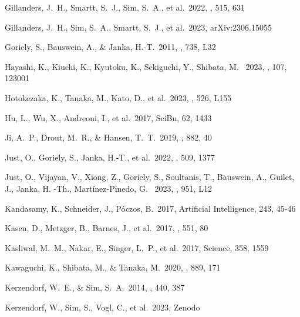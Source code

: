 \documentclass[twocolumn,twocolappendix]{aastex63}
\begin{document}
{{{{{{{{\begin{thebibliography}{}
 Gillanders, J.~H., Smartt, S.~J., Sim, S.~A., et al.\ 2022, \mnras, 515, 631


 Gillanders, J.~H., Sim, S.~A., Smartt, S.~J., et al.\ 2023, arXiv:2306.15055


 Goriely, S., Bauswein, A., \& Janka, H.-T.\ 2011, \apjl, 738, L32


 Hayashi, K., Kiuchi, K., Kyutoku, K., Sekiguchi, Y., Shibata, M. \ 2023, \prd, 107, 123001


 Hotokezaka, K., Tanaka, M., Kato, D., et al.\ 2023, \mnras, 526, L155


 Hu, L., Wu, X., Andreoni, I., et al.\ 2017, SciBu, 62, 1433


 Ji, A.~P., Drout, M.~R., \& Hansen, T.~T.\ 2019, \apj, 882, 40


 Just, O., Goriely, S., Janka, H.-T., et al.\ 2022, \mnras, 509, 1377

 Just, O., Vijayan, V., Xiong, Z., Goriely, S., Soultanis, T., Bauswein, A., Guilet, J., Janka, H. -Th., Martínez-Pinedo, G. \ 2023, \apjl, 951, L12


 Kandasamy, K., Schneider, J., P{\'o}czos, B.\ 2017, Artificial Intelligence, 243, 45-46


 Kasen, D., Metzger, B., Barnes, J., et al.\ 2017, \nat, 551, 80


 Kasliwal, M.~M., Nakar, E., Singer, L.~P., et al.\ 2017, Science, 358, 1559


 Kawaguchi, K., Shibata, M., \& Tanaka, M.\ 2020, \apj, 889, 171


 Kerzendorf, W.~E., \& Sim, S.~A.\ 2014, \mnras, 440, 387


 Kerzendorf, W., Sim, S., Vogl, C., et al.\ 2023, Zenodo



\end{thebibliography}}}}}}}}}
\end{document}
